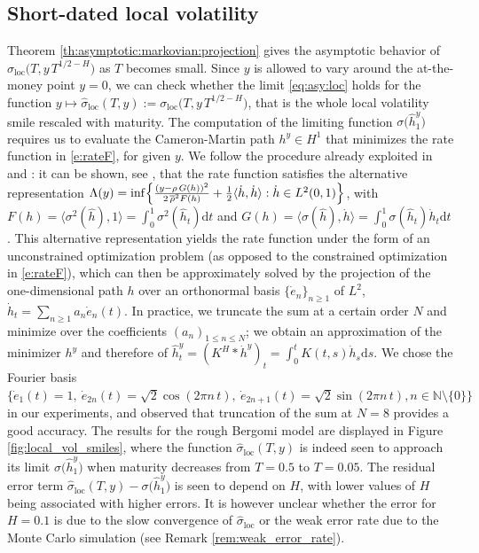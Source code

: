 \documentclass[11pt]{article}
\theoremstyle{plain}
\theoremstyle{definition}
\theoremstyle{remark}
\renewcommand{\bar}{\overline}
\renewcommand{\hat}{\widehat}
\newcommand{\dd}{\mathrm{d}}
\newcommand{\1}{\mathbf{1}}
\numberwithin{equation}{section}
\def\sigDup{\sigma_\mathrm{loc}}
\begin{document}
\subsection{Short-dated local volatility} \label{s:short_dated_LV}

Theorem \ref{th:asymptotic:markovian:projection} gives the asymptotic behavior of $\sigDup \bigl(T, y \, T^{1/2-H} \bigr)$ as $T$ becomes small. 
Since $y$ is allowed to vary around the at-the-money point $y=0$,  we can check whether the limit \eqref{eq:asy:loc} holds for the function $y \mapsto \hat{\sigma}_{\mathrm{loc}}(T,y) := \sigDup \bigl(T, y \, T^{1/2-H} \bigr)$, that is the whole local volatility smile rescaled with maturity.
The computation of the limiting function $\sigma\bigl( \hat h^y_1 \bigr)$ requires us to evaluate the Cameron-Martin path $h^y \in H^1$ that minimizes the rate function in \eqref{e:rateF}, for given $y$. 
We follow the procedure already exploited in \cite{forde2017asymptotics} and \cite[section 5.1]{friz2021short} : it can be shown, see \cite{forde2017asymptotics}, that the rate function satisfies the alternative representation 
$\Lambda(y) = \inf \Bigl\{\frac{(y - \rho \, G(h))^2}{2 \, \bar \rho^2 F(h)} + \frac 12 \langle \dot{h}, \dot{h} \rangle: \dot{h} \in L^2(0,1) \Bigr\}$, with $F(h) = \langle \sigma^2(\hat h), 1 \rangle = \int_0^1 \sigma^2(\hat h_t) \dd t$ and $G(h) = \langle \sigma(\hat h),  \dot h \rangle = \int_0^1 \sigma(\hat h_t) \dot h_t \dd t$.
This alternative representation yields the rate function under the form of  an unconstrained optimization problem (as opposed to the constrained optimization in \eqref{e:rateF}), which can then be approximately solved by the projection of the one-dimensional path $h$ over an orthonormal basis $\{\dot{e}_n\}_{n \ge 1}$ of $L^2$, $\dot{h}_t = \sum_{n \ge 1} a_n \dot{e}_n(t)$. 
In practice, we truncate the sum at a certain order $N$ and minimize over the coefficients $(a_n)_{1 \le n \le N}$; we obtain an approximation of the minimizer $h^y$ and therefore of $\hat h^y_t = (K^H * \dot h^y)_t = \int_0^t K(t,s) \dot h_s \dd s$.
We chose the Fourier basis $\bigl\{\dot{e}_{1}(t) =1, \ \dot{e}_{2n}(t) = \sqrt 2 \cos(2 \pi n \, t), \ \dot{e}_{2n+1}(t) = \sqrt 2 \sin(2 \pi n \, t), n \in \mathbb N \setminus \{0\}  \bigr\}$ in our experiments, and observed that truncation of the sum at $N = 8$ provides a good accuracy.
The results for the rough Bergomi model are displayed in Figure \ref{fig:local_vol_smiles}, where the function $\hat{\sigma}_{\mathrm{loc}}(T, y)$ is indeed seen to approach its limit $\sigma\bigl( \hat h^y_1 \bigr)$ when maturity decreases from $T=0.5$ to $T=0.05$.
The residual error term $\hat{\sigma}_{\mathrm{loc}}(T, y) - \sigma\bigl( \hat h^y_1 \bigr)$ is seen to depend on $H$, with lower values of $H$ being associated with higher errors.
It is however unclear whether the error for $H = 0.1$ is due to the slow convergence of $\hat{\sigma}_{\mathrm{loc}}$ or the weak error rate due to the Monte Carlo simulation (see Remark \ref{rem:weak_error_rate}).
\end{document}
